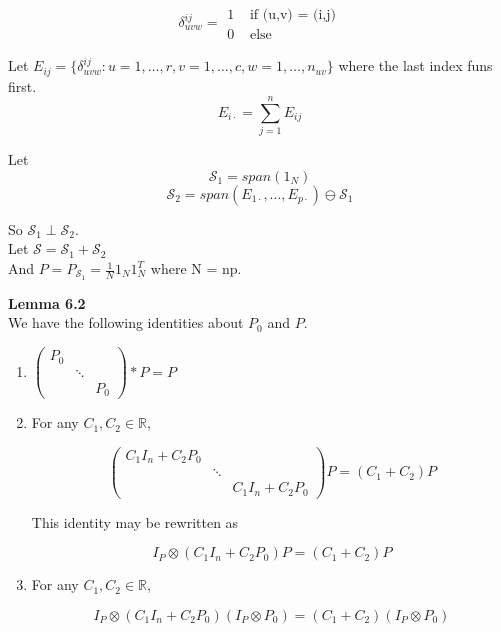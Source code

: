 \documentclass[11pt,fleqn]{book} %
\begin{document}
$$\delta^{ij}_{uvw} =  \begin{array}{ll}
		    	1 & \text{ if (u,v) = (i,j)} \\
		    	0 & \text{ else}
		    \end{array}$$



Let $E_{ij} = \{\delta^{ij}_{uvw}: u = 1, \dots, r, v = 1, \dots, c, w = 1, \dots, n_{uv}  \}$ where the last index funs first. \\


			$$E_{i\cdot} = \sum^n_{j=1} E_{ij}$$


Let 
		$$\mathcal{S}_1 = span(1_N) $$
		$$\mathcal{S}_2 = span(E_{1 \cdot}, \dots, E_{p \cdot}) \ominus \mathcal{S}_1 $$

So $\mathcal{S}_1 \perp \mathcal{S}_2$.\\


Let $\mathcal{S}  = \mathcal{S}_1 + \mathcal{S}_2$\\

And $P =  P_{\mathcal{S}_1} = \frac{1}{N} 1_N 1_N^T$ where N = np. 


\textbf{Lemma 6.2}\\

We have the following identities about $P_0$ and $P$. 

	\begin{enumerate}
		\item $\begin{pmatrix}
					P_0 & &\\
					 & \ddots &\\
					 & & P_0 
				\end{pmatrix} * P = P $

		\item For any $C_1, C_2 \in \mathbb{R}$, 

				$$\begin{pmatrix}
					C_1I_n + C_2 P_0 & &\\
					& \ddots & \\
					& & C_1I_n + C_2 P_0
				\end{pmatrix}P = (C_1 + C_2)P $$ 

		This identity may be rewritten as

				$$I_P \otimes (C_1 I_n + C_2 P_0)P = (C_1 + C_2)P $$

		\item For any $C_1, C_2 \in \mathbb{R}$, 

			$$I_P \otimes (C_1 I_n + C_2 P_0)(I_P \otimes P_0) = (C_1 + C_2)(I_P \otimes P_0) $$
	\end{enumerate}
\end{document}
